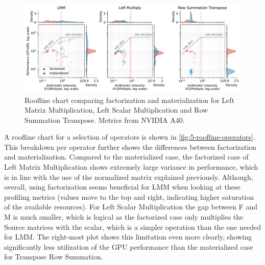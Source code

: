 \begin{figure}[ht]
    \centering
    \includegraphics[width=\linewidth]{chapters/05_cost_estimation/figures/roofline-operators.pdf}
    \caption[Roofline chart per operator]{Roofline chart comparing factorization and materialization for Left Matrix Multiplication, Left Scalar Multiplication and Row Summation Transpose. Metrics from NVIDIA A40.}
    \label{fig:5-roofline-operators}
\end{figure}

A roofline chart for a selection of operators is shown in \autoref{fig:5-roofline-operators}. This breakdown per operator further shows the differences between factorization and materialization. Compared to the materialized case, the factorized case of Left Matrix Multiplication shows extremely large variance in performance, which is in line with the use of the normalized matrix explained previously. Although, overall, using factorization seems beneficial for LMM when looking at these profiling metrics (values move to the top and right, indicating higher saturation of the available resources). For Left Scalar Multiplication the gap between F and M is much smaller, which is logical as the factorized case only multiplies the Source matrices with the scalar, which is a simpler operation than the one needed for LMM. The right-most plot shows this limitation even more clearly, showing significantly less utilization of the GPU performance than the materialized case for Transpose Row Summation.

